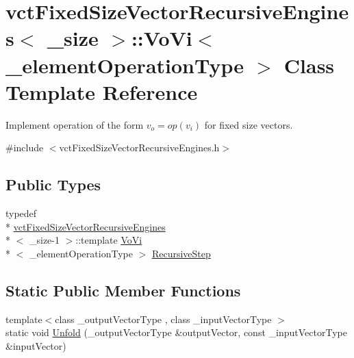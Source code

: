 \hypertarget{classvct_fixed_size_vector_recursive_engines_1_1_vo_vi}{\section{vct\-Fixed\-Size\-Vector\-Recursive\-Engines$<$ \-\_\-size $>$\-:\-:Vo\-Vi$<$ \-\_\-element\-Operation\-Type $>$ Class Template Reference}
\label{classvct_fixed_size_vector_recursive_engines_1_1_vo_vi}
}


Implement operation of the form $v_o = op(v_i)$ for fixed size vectors.  




{\ttfamily \#include $<$vct\-Fixed\-Size\-Vector\-Recursive\-Engines.\-h$>$}

\subsection*{Public Types}
\begin{DoxyCompactItemize}
\item 
typedef \\*
\hyperlink{classvct_fixed_size_vector_recursive_engines}{vct\-Fixed\-Size\-Vector\-Recursive\-Engines}\\*
$<$ \-\_\-size-\/1 $>$\-::template \hyperlink{classvct_fixed_size_vector_recursive_engines_1_1_vo_vi}{Vo\-Vi}\\*
$<$ \-\_\-element\-Operation\-Type $>$ \hyperlink{classvct_fixed_size_vector_recursive_engines_1_1_vo_vi_ac104b8d2ed9b8652bc03c1bfd9908ff1}{Recursive\-Step}
\end{DoxyCompactItemize}
\subsection*{Static Public Member Functions}
\begin{DoxyCompactItemize}
\item 
{\footnotesize template$<$class \-\_\-output\-Vector\-Type , class \-\_\-input\-Vector\-Type $>$ }\\static void \hyperlink{classvct_fixed_size_vector_recursive_engines_1_1_vo_vi_acef22e4b43112a52c7701d3e84d904f5}{Unfold} (\-\_\-output\-Vector\-Type \&output\-Vector, const \-\_\-input\-Vector\-Type \&input\-Vector)
\end{DoxyCompactItemize}


